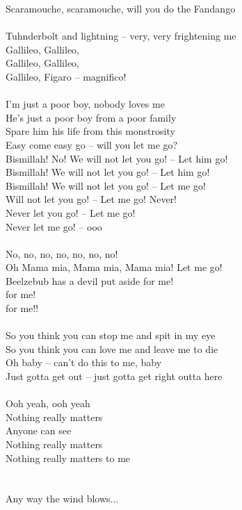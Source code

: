 Scaramouche, scaramouche, will you do the Fandango \\
\\
Tuhnderbolt and lightning -- very, very frightening me \\
Gallileo, Gallileo, \\
Gallileo, Gallileo, \\
Gallileo, Figaro -- magnifico! \\
\\
I'm just a poor boy, nobody loves me \\
He's just a poor boy from a poor family \\
Spare him his life from this monstrosity \\
Easy come easy go -- will you let me go? \\
Bismillah! No! We will not let you go! -- Let him go! \\
Bismillah! We will not let you go! -- Let him go! \\
Bismillah! We will not let you go! -- Let me go! \\
Will not let you go! -- Let me go! Never! \\
Never let you go! -- Let me go! \\
Never let me go! -- ooo \\
\\
No, no, no, no, no, no, no! \\
Oh Mama mia, Mama mia, Mama mia! Let me go! \\
Beelzebub has a devil put aside for me! \\
for me! \\
for me!! \\
\\
So you think you can stop me and spit in my eye \\
So you think you can love me and leave me to die \\
Oh baby -- can't do this to me, baby \\
Just gotta get out -- just gotta get right outta here \\
\\
Ooh yeah, ooh yeah \\
Nothing really matters \\
Anyone can see \\
Nothing really matters \\
Nothing really matters to me \\
\\
\\
Any way the wind blows... \\
\newpage